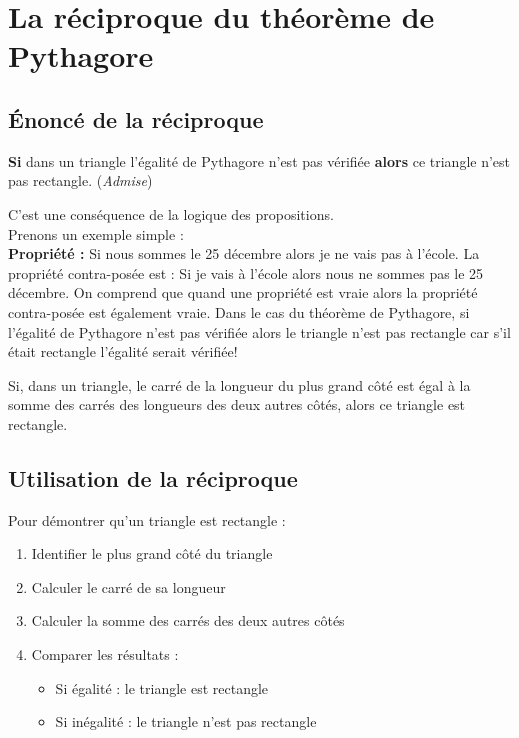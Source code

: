 \section{La réciproque du théorème de Pythagore}

\subsection{Énoncé de la réciproque}
\begin{theoremebox}
	\textbf{Si} dans un triangle l’égalité de Pythagore n’est pas vérifiée \textbf{alors} ce triangle n’est pas rectangle. \qquad (\textit{Admise})
\end{theoremebox}
\begin{demobox}
C’est une conséquence de la logique des propositions.\\
Prenons un exemple simple :\\

\textbf{Propriété :} Si nous sommes le 25 décembre alors je ne vais pas à l’école. La propriété contra-posée est : Si je vais à l'école alors nous ne sommes pas le 25 décembre. On comprend que quand une propriété est vraie alors la propriété contra-posée est également vraie. Dans le cas du théorème de Pythagore, si l’égalité de Pythagore n’est pas vérifiée alors le triangle n’est pas rectangle car s’il était rectangle l’égalité serait vérifiée!
\end{demobox}
\begin{theoremebox}
Si, dans un triangle, le carré de la longueur du plus grand côté est égal à la somme des carrés des longueurs des deux autres côtés, alors ce triangle est rectangle.
\end{theoremebox}


\subsection{Utilisation de la réciproque}
\begin{methodebox}
Pour démontrer qu'un triangle est rectangle :
\begin{enumerate}
    \item Identifier le plus grand côté du triangle
    \item Calculer le carré de sa longueur
    \item Calculer la somme des carrés des deux autres côtés
    \item Comparer les résultats :
    \begin{itemize}
        \item Si égalité : le triangle est rectangle
        \item Si inégalité : le triangle n'est pas rectangle
    \end{itemize}
\end{enumerate}
\end{methodebox}

